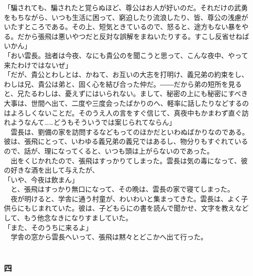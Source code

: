\documentclass[
  paper=a5,
  fontsize=10pt,
  jafontsize=9.5pt,
  tate,                  %
  open_bracket_pos=nibu, %
]{jlreq}
\begin{document}
「騙されても、騙されたと覚らぬほど、尊公はお人が好いのだ。それだけの武勇をもちながら、いつも生活に困って、窮迫したり流浪したり、皆、尊公の浅慮がいたすところである。その上、短気ときているので、怒ると、途方もない暴をやる。だから張飛は悪いやつだと反対な誤解をまねいたりする。すこし反省せねばいかん」\\


「おい雲長。拙者は今夜、なにも貴公のを聞こうと思って、こんな夜中、やって来たわけではないぜ」\\


「だが、貴公とわしとは、かねて、お互いの大志を打明け、義兄弟の約束をし、わしは兄、貴公は弟と、固く心を結び合った仲だ。――だから弟の短所を見ると、兄たるわしは、憂えずにはいられない。まして、秘密の上にも秘密にすべき大事は、世間へ出て、二度や三度会ったばかりのへ、軽率に話したりなどするのはよろしくないことだ。そのうえ人の言をすぐ信じて、真夜中もかまわず直ぐ訪れようなんて……どうもそういうでは案じられてならん」\\


　雲長は、劉備の家を訪問するなどもってのほかだといわぬばかりなのである。彼は、張飛にとって、いわゆる義兄弟の義兄ではあるし、物分りもすぐれているので、話が、理になってくると、いつも頭は上がらないのであった。\\


　出をくじかれたので、張飛はすっかりてしまった。雲長は気の毒になって、彼の好きな酒を出して与えたが、\\


「いや、今夜は飲まん」\\


　と、張飛はすっかり無口になって、その晩は、雲長の家で寝てしまった。\\


　夜が明けると、学舎に通う村童が、わいわいと集まってきた。雲長は、よく子供らにもじまれていた。彼は、子どもらにの書を読んで聞かせ、文字を教えなどして、もう他念なきになりすましていた。\\


「また、そのうちに来るよ」\\


　学舎の窓から雲長へいって、張飛は黙々とどこかへ出て行った。\\

\\

\subsubsection{四}
\end{document}
